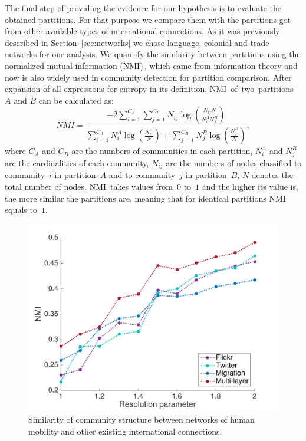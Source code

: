 \documentclass[aps,superscriptaddress,showkeys,nofootinbib]{revtex4-1}
\begin{document}
The final step of providing the evidence for our hypothesis is to evaluate the obtained partitions. For that purpose we compare them with the partitions got from other available types of international connections. As it was previously described in Section~\ref{sec:networks} we chose language, colonial and trade networks for our analysis. We quantify the similarity between partitions using the normalized mutual information (NMI)\,\cite{Danon2005}, which came from information theory and now is also widely used in community detection for partition comparison. After expansion of all expressions for entropy in its definition, NMI~of~two~partitions $A$ and $B$ can be calculated as:
\[
	NMI = 
	\frac{
		-2\sum_{i=1}^{C_A}\sum_{j=1}^{C_B} N_{ij} \log\left( \frac{N_{ij} N}{N^{A}_i N^{B}_j} \right)
	}{
		\sum_{i=1}^{C_A} N^{A}_i \log\left( \frac{N^{A}_i}{N} \right) + \sum_{j=1}^{C_B} N^{B}_j \log\left( \frac{N^{B}_j}{N} \right)
	},
\]
where $C_A$ and $C_B$ are the numbers of communities in each partition, $N^{A}_i$ and $N^{B}_j$ are the cardinalities of each community, $N_{ij}$ are the numbers of nodes classified to community~$i$ in partition~$A$ and to community~$j$ in partition~$B$, $N$ denotes the total number of nodes. NMI~takes values from~$0$ to~$1$ and the higher its value is, the more similar the partitions are, meaning that for identical partitions NMI equals to~$1$.

\begin{figure}[t!]
\centering
\includegraphics[width=.65\textwidth]{NMI_AVG-eps-converted-to.pdf}
\caption{\label{fig::NMI}Similarity of community structure between networks of human mobility and other existing international connections.}
\end{figure}
\end{document}
